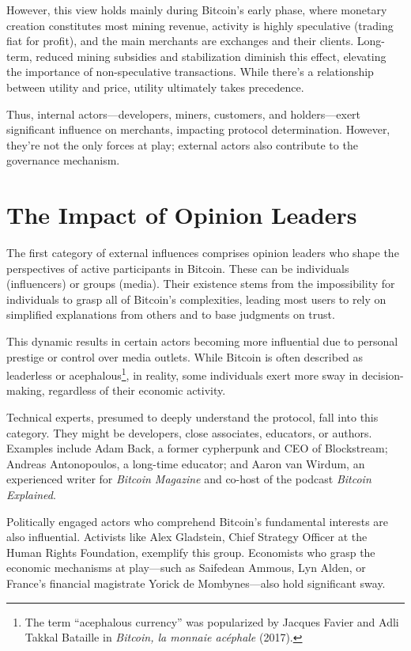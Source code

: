 \documentclass[
  a5paper,
  smalldemyvopaper,10pt,twoside,onecolumn,openright,extrafontsizes,hidelinks]{memoir}
\begin{document}
However, this view holds mainly during Bitcoin's early phase, where
monetary creation constitutes most mining revenue, activity is highly
speculative (trading fiat for profit), and the main merchants are
exchanges and their clients. Long-term, reduced mining subsidies and
stabilization diminish this effect, elevating the importance of
non-speculative transactions. While there's a relationship between
utility and price, utility ultimately takes precedence.

Thus, internal actors---developers, miners, customers, and
holders---exert significant influence on merchants, impacting protocol
determination. However, they're not the only forces at play; external
actors also contribute to the governance mechanism.

\section*{The Impact of Opinion
Leaders}\label{the-impact-of-opinion-leaders}


The first category of external influences comprises opinion leaders who
shape the perspectives of active participants in Bitcoin. These can be
individuals (influencers) or groups (media). Their existence stems from
the impossibility for individuals to grasp all of Bitcoin's
complexities, leading most users to rely on simplified explanations from
others and to base judgments on trust.

This dynamic results in certain actors becoming more influential due to
personal prestige or control over media outlets. While Bitcoin is often
described as leaderless or acephalous\footnote{The term ``acephalous
  currency'' was popularized by Jacques Favier and Adli Takkal Bataille
  in \emph{Bitcoin, la monnaie acéphale} (2017).}, in reality, some
individuals exert more sway in decision-making, regardless of their
economic activity.

Technical experts, presumed to deeply understand the protocol, fall into
this category. They might be developers, close associates, educators, or
authors. Examples include Adam Back, a former cypherpunk and CEO of
Blockstream; Andreas Antonopoulos, a long-time educator; and Aaron van
Wirdum, an experienced writer for \emph{Bitcoin Magazine} and co-host of
the podcast \emph{Bitcoin Explained}.

Politically engaged actors who comprehend Bitcoin's fundamental
interests are also influential. Activists like Alex Gladstein, Chief
Strategy Officer at the Human Rights Foundation, exemplify this group.
Economists who grasp the economic mechanisms at play---such as Saifedean
Ammous, Lyn Alden, or France's financial magistrate Yorick de
Mombynes---also hold significant sway.
\end{document}
